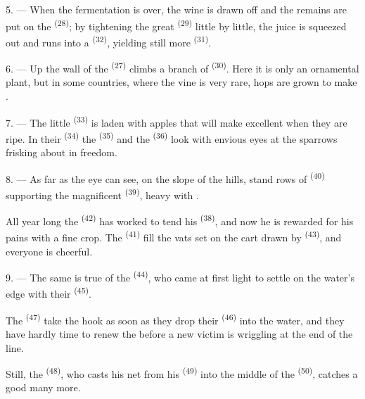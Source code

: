 5. --- When the fermentation is over, the wine is drawn off and the
remains are put on the  \textsuperscript{(28)}; by tightening the
great  \textsuperscript{(29)} little by little, the juice is squeezed
out and runs into a  \textsuperscript{(32)}, yielding still more
 \textsuperscript{(31)}.

\VUsaut{6.0mm}
\VUsaut{3.4mm}

6. --- Up the wall of the  \textsuperscript{(27)} climbs a branch of
 \textsuperscript{(30)}. Here it is only an ornamental plant, but in
some countries, where the vine is very rare, hops are grown to make
.

7. --- The little  \textsuperscript{(33)} is laden with apples
that will make excellent  when they are ripe. In their
 \textsuperscript{(34)} the  \textsuperscript{(35)} and the
 \textsuperscript{(36)} look with envious eyes at the sparrows
frisking about in freedom.

8. --- As far as the eye can see, on the slope of the hills, stand rows of
 \textsuperscript{(40)} supporting the magnificent
 \textsuperscript{(39)}, heavy with .

All year long the  \textsuperscript{(42)} has worked to tend his
 \textsuperscript{(38)}, and now he is rewarded for his pains with
a fine crop. The  \textsuperscript{(41)} fill the vats set on
the cart drawn by  \textsuperscript{(43)}, and everyone is cheerful.

\VUsaut{5.0mm}
\VUsaut{3.4mm}

9. --- The same is true of the  \textsuperscript{(44)}, who came at
first light to settle on the water's edge with their 
\textsuperscript{(45)}.

The  \textsuperscript{(47)} take the hook as soon as they drop their
 \textsuperscript{(46)} into the water, and they have hardly time to
renew the  before a new victim is wriggling at the end of the
line.

Still, the  \textsuperscript{(48)}, who casts his net from his
 \textsuperscript{(49)} into the middle of the 
\textsuperscript{(50)}, catches a good many more.

